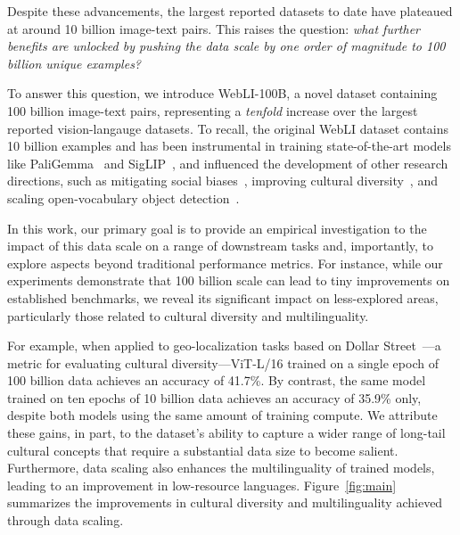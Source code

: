 Despite these advancements, the largest reported datasets to date have plateaued at around 10 billion image-text pairs. This raises the question: \emph{what further benefits are unlocked by pushing the data scale by one order of magnitude to 100 billion unique examples?}




To answer this question, we introduce WebLI-100B, a novel dataset containing 100 billion image-text pairs, representing a \emph{tenfold} increase over the largest reported vision-langauge datasets. To recall, the original WebLI dataset contains 10 billion examples and has been instrumental in training state-of-the-art models like PaliGemma~\cite{beyer2024paligemma,steiner2024paligemma2familyversatile} and SigLIP~\cite{zhai2023sigmoidlosslanguageimage}, and influenced the development of other research directions, such as mitigating social biases~\cite{alabdulmohsin2024clip}, improving cultural diversity~\cite{pouget2024no}, and scaling open-vocabulary object detection~\cite{minderer2024scaling}.

In this work, our primary goal is to provide an empirical investigation to the impact of this data scale on a range of downstream tasks and, importantly, to explore aspects beyond traditional performance metrics. For instance, while our experiments demonstrate that 100 billion scale can lead to tiny improvements on established benchmarks, we reveal its significant impact on less-explored areas, particularly those related to cultural diversity and multilinguality.

For example, when applied to geo-localization tasks based on Dollar Street~\cite{rojas2022dollar}---a metric for evaluating cultural diversity---ViT-L/16 trained on a single epoch of 100 billion data achieves an accuracy of 41.7\%. By contrast, the same model trained on ten epochs of 10 billion data achieves an accuracy of 35.9\% only, despite both models using the same amount of training compute. We attribute these gains, in part, to the dataset's ability to capture a wider range of long-tail cultural concepts that require a substantial data size to become salient. Furthermore, data scaling also enhances the multilinguality of trained models, leading to an improvement in low-resource languages. Figure~\ref{fig:main} summarizes the  improvements in cultural diversity and multilinguality achieved through data scaling.

